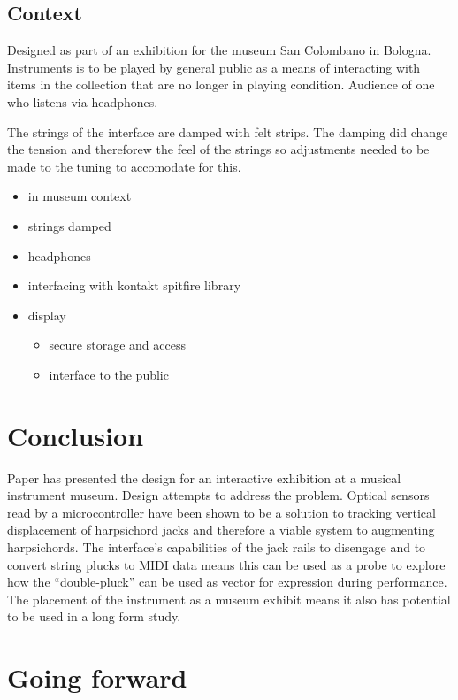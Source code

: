 \subsection{Context}\label{context}

Designed as part of an exhibition for the museum San Colombano in
Bologna. Instruments is to be played by general public as a means of
interacting with items in the collection that are no longer in playing
condition. Audience of one who listens via headphones.

The strings of the interface are damped with felt strips. The damping
did change the tension and thereforew the feel of the strings so
adjustments needed to be made to the tuning to accomodate for this.

\begin{itemize}
\item
  in museum context
\item
  strings damped
\item
  headphones
\item
  interfacing with kontakt spitfire library
\item
  display

  \begin{itemize}
  \item
    secure storage and access
  \item
    interface to the public
  \end{itemize}
\end{itemize}



\section{Conclusion}\label{conclusion}

Paper has presented the design for an interactive exhibition at a musical instrument museum. Design attempts to address the problem.
Optical sensors read by a microcontroller have been shown to be a solution to tracking vertical displacement of harpsichord jacks and therefore a viable system to augmenting harpsichords. The interface's capabilities of the jack rails to disengage and to convert string plucks to MIDI data means this can be used as a probe to explore how the ``double-pluck'' can be used as vector for expression during performance. The placement of the instrument as a museum exhibit means it also has potential to be used in a long form study.

\section{Going forward}\label{going-forward}

